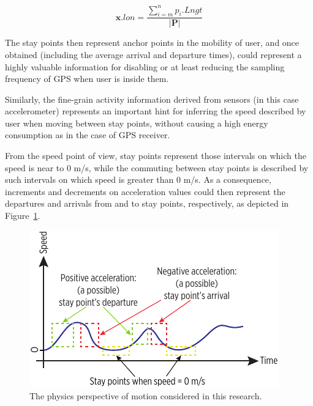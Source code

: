 \documentclass[ENG,PhD]{cinvestav}
\begin{document}
\begin{equation}
\mathbf{x}.lon = \frac{ \sum_{i=m}^{n}p_{i}.Lngt }{ |\mathbf{P}| }\label{eq:centroid-longitude}
\end{equation}

The stay points then represent anchor points in the mobility of user, and once obtained (including the average arrival and departure times), could represent a highly valuable information for disabling or at least reducing the sampling frequency of GPS when user is inside them.

Similarly, the fine-grain activity information derived from sensors (in this case accelerometer) represents an important hint for inferring the speed described by user when moving between stay points, without causing a high energy consumption as in the case of GPS receiver.

From the speed point of view, stay points represent those intervals on which the speed is near to 0 m/s, while the commuting between stay points is described by such intervals on which speed is greater than 0 m/s. 
As a consequence, increments and decrements on acceleration values could then represent the departures and arrivals from and to stay points, respectively, as depicted in Figure~\ref{fig:physics-perspective-of-motion}.

\begin{figure}
  \centering
  \includegraphics[]{vectors/physics-perspective-of-motion}
  \caption{The physics perspective of motion considered in this research.}
  \label{fig:physics-perspective-of-motion}
\end{figure}
\end{document}
